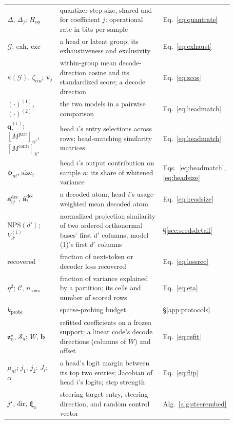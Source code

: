\begin{longtable}{@{}>{\raggedright\arraybackslash}p{0.25\linewidth}%
>{\raggedright\arraybackslash}p{0.52\linewidth}%
>{\raggedright\arraybackslash}p{0.15\linewidth}@{}}
$\Delta$, $\Delta_j$; $H_{\mathrm{op}}$ & quantizer step size, shared and for coefficient $j$; operational rate in bits per sample & Eq.~\eqref{eq:quantrate} \\
$\mathcal{G}$; $\mathrm{exh}$, $\mathrm{exc}$ & a head or latent group; its exhaustiveness and exclusivity & Eq.~\eqref{eq:exhaust} \\
$\kappa(\mathcal{G})$, $\zeta_{\cos}$; $\mathbf{v}_j$ & within-group mean decode-direction cosine and its standardized score; a decode direction & Eq.~\eqref{eq:zcos} \\
$(\cdot)^{(1)}$, $(\cdot)^{(2)}$ & the two models in a pairwise comparison & Eq.~\eqref{eq:headmatch} \\
$\mathbf{q}^{(1)}_i$; $[M^{\mathrm{part}}]_{ii'}$, $[M^{\mathrm{contr}}]_{ii'}$ & head $i$'s entry selections across rows; head-matching similarity matrices & Eq.~\eqref{eq:headmatch} \\
$\boldsymbol{\phi}_{ni}$, $\mathrm{size}_i$ & head $i$'s output contribution on sample $n$; its share of whitened variance & Eqs.~\eqref{eq:headmatch}, \eqref{eq:headsize} \\
$\mathbf{a}^{\mathrm{dec}}_{ij}$, $\bar{\mathbf{a}}^{\mathrm{dec}}_i$ & a decoded atom; head $i$'s usage-weighted mean decoded atom & Eq.~\eqref{eq:headsize} \\
$\mathrm{NPS}(d')$; $V^{(1)}_{d'}$ & normalized projection similarity of two ordered orthonormal bases' first $d'$ columns; model (1)'s first $d'$ columns & §\ref{sec:seedsdetail} \\
$\mathrm{recovered}$ & fraction of next-token or decoder loss recovered & Eq.~\eqref{eq:lossrec} \\
$\eta^2$; $\mathcal{C}$, $n_{\mathrm{rows}}$ & fraction of variance explained by a partition; its cells and number of scored rows & Eq.~\eqref{eq:eta} \\
$k_{\mathrm{probe}}$ & sparse-probing budget & §\ref{app:protocols} \\
$\mathbf{z}^\star_n$, $\mathcal{S}_n$; $W$, $\mathbf{b}$ & refitted coefficients on a frozen support; a linear code's decode directions (columns of $W$) and offset & Eq.~\eqref{eq:refit} \\
$\mu_{ni}$; $j_1$, $j_2$; $J_i$; $\alpha$ & a head's logit margin between its top two entries; Jacobian of head $i$'s logits; step strength & Eq.~\eqref{eq:flip} \\
$j^\star$, $\mathrm{dir}$, $\boldsymbol{\xi}_n$ & steering target entry, steering direction, and random control vector & Alg.~\ref{alg:steerembed} \\

\end{longtable}
